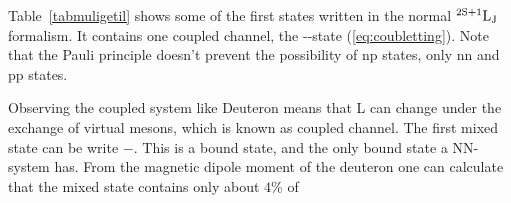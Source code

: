 Table~\ref{tabmuligetil} shows some of the first states written in the normal ${}^\textrm{2S+1} \textrm{L}_\textrm{J}$ formalism.
It contains one coupled channel, the --state (\ref{eq:coubletting}).
Note that the Pauli principle doesn't prevent the possibility of np states, only nn and pp states.\nl

Observing the coupled system like Deuteron means that L can change under the exchange of virtual mesons, which is known as coupled channel.
The first mixed state can be write $-$. This is a bound state, and the only bound state a NN-system has.
From the magnetic dipole moment of the deuteron one can calculate that the mixed state contains only about $4\%$ of  


